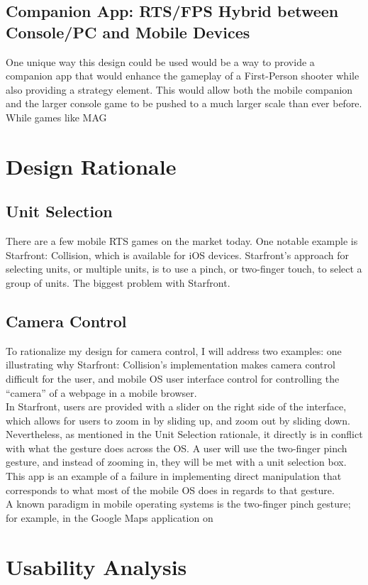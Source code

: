 \documentclass[11pt]{article}
\begin{document}
	\subsection{Companion App: RTS/FPS Hybrid between Console/PC and Mobile Devices}
	One unique way this design could be used would be a way to provide a companion app that would enhance the gameplay of a First-Person shooter while also providing a strategy element. This would allow both the mobile companion and the larger console game to be pushed to a much larger scale than ever before. While games like MAG
\section{Design Rationale}
	\subsection{Unit Selection}
	There are a few mobile RTS games on the market today. One notable example is Starfront: Collision, which is available for iOS devices. Starfront's approach for selecting units, or multiple units, is to use a pinch, or two-finger touch, to select a group of units. The biggest problem with Starfront.
	\subsection{Camera Control}
	To rationalize my design for camera control, I will address two examples: one illustrating why Starfront: Collision's implementation makes camera control difficult for the user, and mobile OS user interface control for controlling the ``camera'' of a webpage in a mobile browser. \\
	In Starfront, users are provided with a slider on the right side of the interface, which allows for users to zoom in by sliding up, and zoom out by sliding down. Nevertheless, as mentioned in the Unit Selection rationale, it directly is in conflict with what the gesture does across the OS. A user will use the two-finger pinch gesture, and instead of zooming in, they will be met with a unit selection box. This app is an example of a failure in implementing direct manipulation that corresponds to what most of the mobile OS does in regards to that gesture. \\
	A known paradigm in mobile operating systems is the two-finger pinch gesture; for example, in the Google Maps application on
\section{Usability Analysis}
\end{document}
